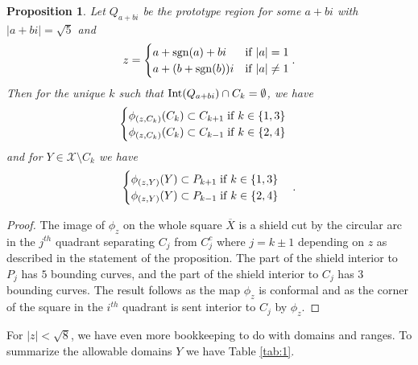 \documentclass[11pt]{amsart}
\theoremstyle{plain}
\newtheorem{proposition}[theorem]{Proposition}
\theoremstyle{definition}
\renewcommand\~{\tilde}%
\newcommand{\cX}{\ensuremath{\mathcal{X}}}
\numberwithin{equation}{section}
\begin{document}
\begin{proposition}\label{edges3}
    Let $Q_{a+bi}$ be the prototype region for some $a+bi$ with $|a+bi| = \sqrt{5}$ and 
    $$
    z = \begin{cases}a+{\rm sgn}(a)+bi & {\rm  if}\; |a| = 1\\
    a+(b+{\rm sgn}(b))i & {\rm if}\; |a|\neq 1
    \end{cases}.
    $$
    Then for the unique $k$ such that ${\rm Int}(Q_{a+bi})\cap C_k = \emptyset$, we have 
    $$
    \begin{cases}
        \phi_{(z,C_k)}(C_k)\subset C_{k+1} \; {\rm if}\; k\in \{1,3\}\\ 
        \phi_{(z,C_k)}(C_k) \subset C_{k-1} \; {\rm if}\; k\in \{2,4\}
    \end{cases}
    $$
    and for $Y\in \cX\setminus{C_k}$ we have
    $$
        \begin{cases}
        \phi_{(z,Y)}(Y)\subset P_{k+1} \; {\rm if}\; k\in \{1,3\}\\ 
        \phi_{(z,Y)}(Y)\subset P_{k-1} \; {\rm if}\; k\in \{2,4\}
        \end{cases}.
    $$
\end{proposition}

\begin{proof}
    The image of $\phi_{z}$ on the whole square $\overline{X}$ is a shield cut by the circular arc in the $j^{th}$ quadrant separating $C_j$ from $C_j^c$ where $j = k\pm 1$ depending on $z$ as described in the statement of the proposition. The part of the shield interior to $P_j$ has $5$ bounding curves, and the part of the shield interior to $C_j$ has $3$ bounding curves. The result follows as the map $\phi_z$ is conformal and as the corner of the square in the $i^{th}$ quadrant is sent interior to $C_j$ by $\phi_{z}$. 
\end{proof}

For $|z| < \sqrt{8}$, we have even more bookkeeping to do with domains and ranges. To summarize the allowable domains $Y$ we have Table \ref{tab:1}.  
\end{document}
